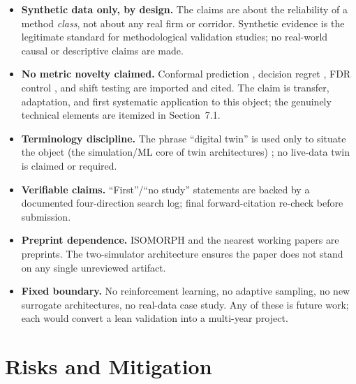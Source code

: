 \documentclass[12pt,a4paper]{article}
\begin{document}
\begin{itemize}
\item \textbf{Synthetic data only, by design.} The claims are about the reliability of a method \emph{class}, not about any real firm or corridor. Synthetic evidence is the legitimate standard for methodological validation studies; no real-world causal or descriptive claims are made.
\item \textbf{No metric novelty claimed.} Conformal prediction \citep{vovk2005,angelopoulos2023,tibshirani2019}, decision regret \citep{elmachtoub2022,ban2019}, FDR control \citep{benjamini1995,benjamini2001}, and shift testing are imported and cited. The claim is transfer, adaptation, and first systematic application to this object; the genuinely technical elements are itemized in Section~7.1.
\item \textbf{Terminology discipline.} The phrase ``digital twin'' is used only to situate the object (the simulation/ML core of twin architectures) \citep{ivanov2021,meliani2026}; no live-data twin is claimed or required.
\item \textbf{Verifiable claims.} ``First''/``no study'' statements are backed by a documented four-direction search log; final forward-citation re-check before submission.
\item \textbf{Preprint dependence.} ISOMORPH \citep{zhang2026isomorph} and the nearest working papers \citep{li2026ssrn,acuna2026} are preprints. The two-simulator architecture ensures the paper does not stand on any single unreviewed artifact.
\item \textbf{Fixed boundary.} No reinforcement learning, no adaptive sampling, no new surrogate architectures, no real-data case study. Any of these is future work; each would convert a lean validation into a multi-year project.
\end{itemize}

\section{Risks and Mitigation}
\end{document}
